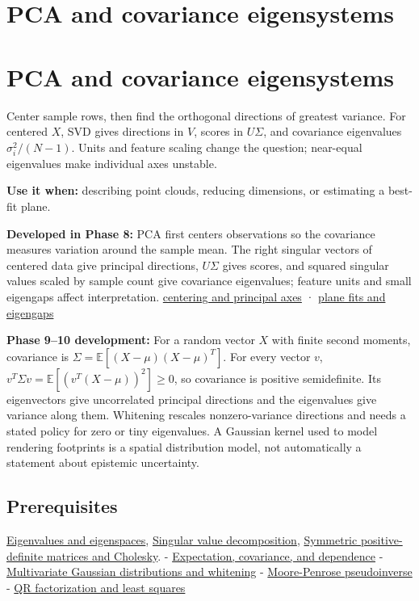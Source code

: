 \hypertarget{appendix-ad175ef3c5bf}{}
\section*{PCA and covariance eigensystems}
\section{PCA and covariance eigensystems}\label{appendix-ad175ef3c5bf-pca-and-covariance-eigensystems}

Center sample rows, then find the orthogonal directions of greatest variance. For centered \(X\), SVD gives directions in \(V\), scores in \(U\Sigma\), and covariance eigenvalues \(\sigma_i^2/(N-1)\). Units and feature scaling change the question; near-equal eigenvalues make individual axes unstable.

\textbf{Use it when:} describing point clouds, reducing dimensions, or estimating a best-fit plane.

\textbf{Developed in Phase 8:} PCA first centers observations so the covariance measures variation around the sample mean. The right singular vectors of centered data give principal directions, \(U\Sigma\) gives scores, and squared singular values scaled by sample count give covariance eigenvalues; feature units and small eigengaps affect interpretation. \hyperref[02-foundations-ii-ch024-centered-measurements-reveal-principal-directions]{centering and principal axes} · \hyperref[02-foundations-ii-ch024-plane-fits-eigengaps-and-interpretation-of-uncertain-components]{plane fits and eigengaps}

\textbf{Phase 9--10 development:} For a random vector \(X\) with finite second moments, covariance is \(\Sigma=\mathbb E[(X-\mu)(X-\mu)^T]\). For every vector \(v\), \(v^T\Sigma v=\mathbb E[(v^T(X-\mu))^2]\geq0\), so covariance is positive semidefinite. Its eigenvectors give uncorrelated principal directions and the eigenvalues give variance along them. Whitening rescales nonzero-variance directions and needs a stated policy for zero or tiny eigenvalues. A Gaussian kernel used to model rendering footprints is a spatial distribution model, not automatically a statement about epistemic uncertainty.

\subsection{Prerequisites}\label{appendix-ad175ef3c5bf-prerequisites}

\hyperref[appendix-0b3be18411f9]{Eigenvalues and eigenspaces}, \hyperref[appendix-1fad5e7f36fa]{Singular value decomposition}, \hyperref[appendix-50d2ea3c9b26]{Symmetric positive-definite matrices and Cholesky}. - \hyperref[appendix-54c383df9992]{Expectation, covariance, and dependence} - \hyperref[appendix-12bbe185dbe5]{Multivariate Gaussian distributions and whitening} - \hyperref[appendix-541306fdbc1b]{Moore-Penrose pseudoinverse} - \hyperref[appendix-c3421e6b4f2c]{QR factorization and least squares}

